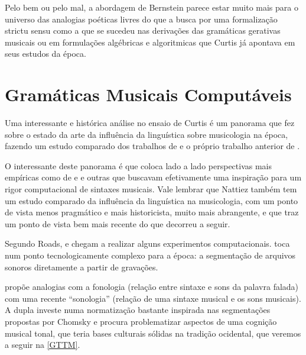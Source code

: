 \documentclass[
	12pt,				%
	openright,			%
	twoside,			%
	a4paper,			%
	english,			%
	french,				%
	spanish,			%
	brazil				%
	]{abntex2}
\begin{document}
Pelo bem ou pelo mal, a abordagem de Bernstein parece estar muito mais para o universo das analogias poéticas livres do que a busca por uma formalização strictu sensu \cite{lerdahl2009genesis} como a que se sucedeu nas derivações das gramáticas gerativas musicais \cite{lerdahl1983generative,temperley2004cognition} ou em formulações algébricas e algoritmicas que Curtis  já apontava em seus estudos da época.

 

\section{Gramáticas Musicais Computáveis}

Uma interessante e histórica análise no ensaio de Curtis  é um panorama que fez sobre o estado da arte da influência da linguística sobre musicologia na época, fazendo um estudo comparado dos trabalhos de  e o próprio trabalho anterior de .


O interessante deste panorama é que coloca lado a lado perspectivas mais empíricas como de  e  e outras que buscavam efetivamente uma inspiração para um rigor computacional de sintaxes musicais. Vale lembrar que Nattiez também tem um estudo comparado da influência da linguística na musicologia, com um ponto de vista menos pragmático e mais historicista, muito mais abrangente, e que traz um ponto de vista bem mais recente \cite{nattiez2004modelos} do que decorreu a seguir.


Segundo Roads,  e  chegam a realizar alguns experimentos computacionais.  toca num ponto tecnologicamente complexo para a época: a segmentação de arquivos sonoros diretamente a partir de gravações. 

 propõe analogias com a fonologia (relação entre sintaxe e sons da palavra falada) com uma recente “sonologia” (relação de uma sintaxe musical e os sons musicais). A dupla  investe numa normatização bastante inspirada nas segmentações propostas por Chomsky e procura problematizar aspectos de uma cognição musical tonal, que teria bases culturais sólidas na tradição ocidental, que veremos a seguir na \autoref{GTTM}.
\end{document}
